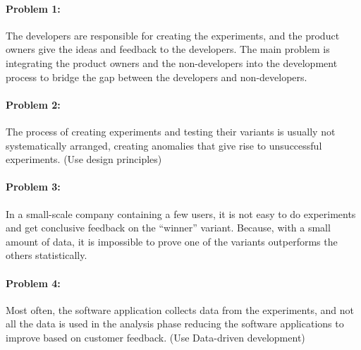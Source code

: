 \paragraph{Problem 1:} The developers are responsible for creating the experiments, and the product owners give the ideas and feedback to the developers.
The main problem is integrating the product owners and the non-developers into the development process to bridge the gap between the developers and non-developers.

\paragraph{Problem 2:} The process of creating experiments and testing their variants is usually not systematically arranged, creating anomalies that give rise to unsuccessful experiments. (Use design principles)

\paragraph{Problem 3:} In a small-scale company containing a few users, it is not easy to do experiments and get conclusive feedback on the ``winner'' variant. 
Because, with a small amount of data, it is impossible to prove one of the variants outperforms the others statistically.

\paragraph{Problem 4:} Most often, the software application collects data from the experiments, and not all the data is used in the analysis phase reducing the software applications to improve based on customer feedback. (Use Data-driven development)

